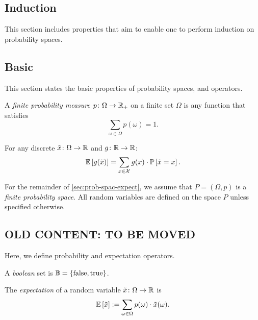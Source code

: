 \subsection{Induction}

This section includes properties that aim to enable one to perform induction on probability spaces. 

\subsection{Basic}

This section states the basic properties of probability spaces, and operators. 

\begin{definition} \label{def:probability-measure}
A \emph{finite probability measure} $p\colon \Omega \to \mathbb{R}_+$ on a finite set $\Omega$ is any function that satisfies
\[
\sum_{\omega \in \Omega } p(\omega) = 1. 
\]
\end{definition}


\begin{theorem} \label{thm:unconscious}
  For any discrete $\tilde{x}\colon \Omega \to \mathbb{R}$ and $g\colon \mathbb{R} \to \mathbb{R}$:
  \[
    \mathbb{E}\left[g(\tilde{x})\right] = \sum_{x\in \mathcal{X}} g(x) \cdot  \mathbb{P}\left[\tilde{x} = x\right].
  \]
\end{theorem}


For the remainder of \cref{sec:prob-spac-expect}, we assume that $P = (\Omega, p)$ is a \emph{finite probability space}. All random variables are defined on the space $P$ unless specified otherwise.

\subsection{OLD CONTENT: TO BE MOVED}

Here, we define probability and expectation operators. 

\begin{definition}
A \emph{boolean} set is $\mathbb{B} = \left\{ \operatorname{false}, \operatorname{true} \right\}$.
\end{definition}

\begin{definition} \label{def:expect}
The \emph{expectation} of a random variable $\tilde{x} \colon \Omega \to \mathbb{R}$ is 
\[
\mathbb{E} \left[ \tilde{x} \right] := \sum_{\omega \in \Omega } p(\omega ) \cdot \tilde{x}(\omega).
\]
\end{definition}

